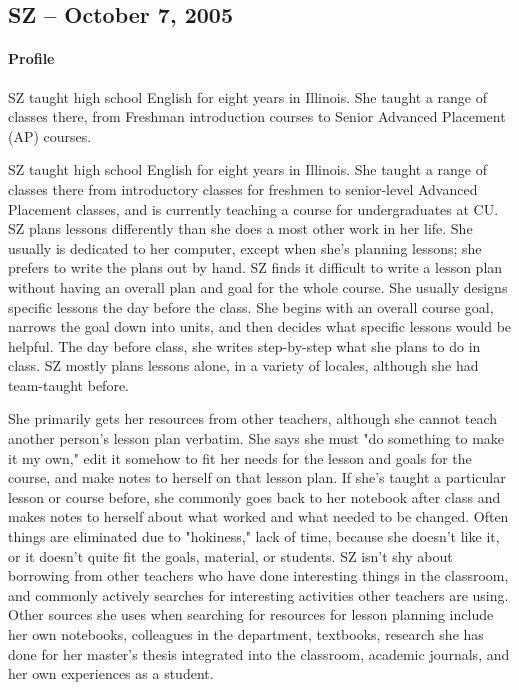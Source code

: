 \documentclass[12pt,titlepage]{article}
\begin{document}
\subsection{SZ -- October 7, 2005}
\paragraph{Profile} SZ taught high school English for eight years in Illinois.
She taught a range of classes there, from Freshman introduction courses to
Senior Advanced Placement (AP) courses.

SZ taught high school English for eight years in Illinois.  She taught a range
of classes there from introductory classes for freshmen to senior-level Advanced
Placement classes, and is currently teaching a course for undergraduates at CU.
SZ  plans lessons differently than she does a most other work in her life.  She
usually is dedicated to her computer, except when she's planning lessons; she
prefers to write the plans out by hand.  SZ finds it difficult to write a lesson
plan without having an overall plan and goal for the whole course.  She usually
designs specific lessons the day before the class.  She begins with an overall
course goal, narrows the goal down into units, and then decides what specific
lessons would be helpful.  The day before class, she writes step-by-step what
she plans to do in class. SZ mostly plans lessons alone, in a variety of
locales, although she had team-taught before.

She primarily gets her resources from other teachers, although she cannot teach
another person's lesson plan verbatim.  She says she must "do something to make
it my own," edit it somehow to fit her needs for the lesson and goals for the
course, and make notes to herself on that lesson plan.  If she's taught a
particular lesson or course before, she commonly goes back to her notebook after
class and makes notes to herself about what worked and what needed to be
changed.  Often things are eliminated due to "hokiness," lack of time, because
she doesn't like it, or it doesn't quite fit the goals, material, or students.
SZ isn't shy about borrowing from other teachers who have done interesting
things in the classroom, and commonly actively searches for interesting
activities other teachers are using.  Other sources she uses when searching for
resources for lesson planning include her own notebooks, colleagues in the
department, textbooks, research she has done for her master's thesis integrated
into the classroom, academic journals, and her own experiences as a student.
\end{document}
